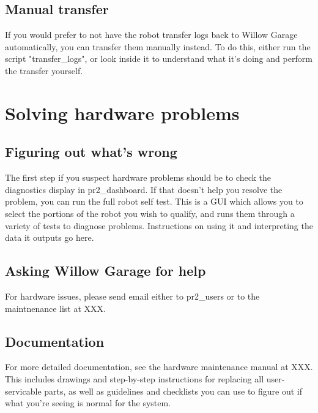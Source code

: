 \subsection{Manual transfer}
If you would prefer to not have the robot transfer logs back to Willow Garage automatically, you can transfer them manually instead.  To do this, either run the script "transfer\_logs", or look inside it to understand what it's doing and perform the transfer yourself.
\section{Solving hardware problems}
\subsection{Figuring out what's wrong}
The first step if you suspect hardware problems should be to check the diagnostics display in pr2\_dashboard.  If that doesn't help you resolve the problem, you can run the full robot self test.  This is a GUI which allows you to select the portions of the robot you wish to qualify, and runs them through a variety of tests to diagnose problems.  Instructions on using it and interpreting the data it outputs go here.
\subsection{Asking Willow Garage for help}
For hardware issues, please send email either to pr2\_users or to the maintnenance list at XXX.
\subsection{Documentation}
For more detailed documentation, see the hardware maintenance manual at XXX.  This includes drawings and step-by-step instructions for replacing all user-servicable parts, as well as guidelines and checklists you can use to figure out if what you're seeing is normal for the system.
